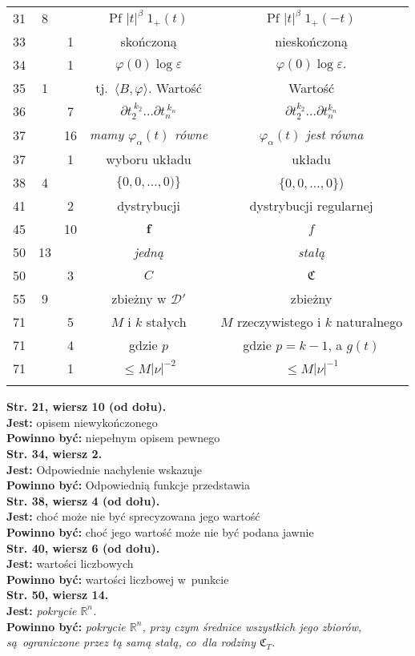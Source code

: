 \documentclass[a4paper,11pt]{article}
\newcommand{\ld}{\ldots}
\newcommand{\mr}{\mathrm}
\newcommand{\mb}{\mathbb}
\newcommand{\mc}{\mathcal}
\newcommand{\mf}{\mathfrak}
\newcommand{\bsym}{\boldsymbol}
\newcommand{\al}{\alpha}
\newcommand{\be}{\beta}
\newcommand{\veps}{\varepsilon}
\newcommand{\vp}{\varphi}
\newcommand{\R}{\mb{R}}
\newcommand{\D}{\mc{D}}
\newcommand{\Rn}{\R^{ n }}
\newcommand{\pr}{\partial}
\newcommand{\lket}{\langle}
\newcommand{\rket}{\rangle}
\newcommand{\tb}{\textbf}
\newcommand{\noi}{\noindent}
\newcommand{\StrWg}[2]{\tb{Str. #1, wiersz #2.}}
\newcommand{\StrWd}[2]{\tb{Str. #1, wiersz #2 (od dołu).}}
\newcommand{\Jest}{\tb{Jest: }}
\newcommand{\Pow}{\tb{Powinno być: }}
\newcommand{\Pf}{\mr{Pf}\,}
\begin{document}
\begin{center}
\begin{tabular}{|c|c|c|c|c|}
    31 & 8 & & $\Pf \, | t |^{ \be } \; 1_{ + }( t )$
           & $\Pf \, | t |^{ \be } \; 1_{ + }( -t )$ \\
    33 & & 1 & skończoną & nieskończoną \\
    34 & & 1 & $\vp( 0 ) \log\veps$ & $\vp( 0 ) \log\veps.$ \\
    35 & 1 & & tj.~$\lket B, \vp \rket$. Wartość & Wartość \\
    36 & & 7 & $\pr t_{ 2 }^{ \: k_{ 2 } } \ld \pr t_{ n }^{ \: k_{ n } }$
           & $\pr t_{ 2 }^{ k_{ 2 } } \ld \pr t_{ n }^{ k_{ n } }$ \\
    37 & & 16 & \emph{mamy $\vp_{ \al }( t )$ równe}
           & \emph{$\vp_{ \al }( t )$ jest równa} \\
    37 & & 1 & wyboru układu & układu \\
    38 & 4 & & $\{ 0, 0, \ld, 0 ) \}$ & $\{ 0, 0, \ld, 0 \}$) \\
    41 & & 2 & dystrybucji & dystrybucji regularnej \\
    45 & & 10 & $\bsym{f}$ & $f$ \\
    50 & 13 & & \emph{jedną} & \emph{stałą} \\
    50 & & 3 & $C$ & $\mf{C}$ \\
    55 & 9 & & zbieżny w $\D'$ & zbieżny \\
    71 & & 5 & $M$ i $k$ stałych & $M$ rzeczywistego i $k$ naturalnego \\
    71 & & 4 & gdzie $p$ & gdzie $p = k - 1$, a $g( t )$\\
    71 & & 1 & $\leq M | \nu |^{ -2 }$ & $\leq M | \nu |^{ -1 }$\\
    & & & & \\ \hline
  \end{tabular}
\end{center}
\noi
\StrWd{21}{10} \\
\Jest opisem niewykończonego \\
\Pow niepełnym opisem pewnego \\
\StrWg{34}{2} \\
\Jest Odpowiednie nachylenie wskazuje \\
\Pow Odpowiednią funkcje przedstawia \\
\StrWd{38}{4} \\
\Jest choć może nie być sprecyzowana jego wartość \\
\Pow choć jego wartość może nie być podana jawnie \\
\StrWd{40}{6} \\
\Jest wartości liczbowych \\
\Pow wartości liczbowej w~punkcie \\
\StrWg{50}{14} \\
\Jest \emph{pokrycie $\Rn$.} \\
\Pow \emph{pokrycie $\Rn$, przy czym średnice wszystkich jego zbiorów,
  są~ograniczone przez tą samą stałą, co~dla rodziny $\mf{C}_{ T }$.} \\









 {}
\end{document}
